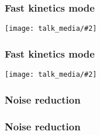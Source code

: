 \documentclass[aspectratio=1610]{beamer}
\newcommand{\pltsingle}[2][0.8]{
	\begin{center}
		\texttt{[image: talk\_media/\#2]}
	\end{center}
}
\begin{document}
\begin{frame}
	\frametitle{Fast kinetics mode}
	\pltsingle[0.7]{fast__kin_4.pdf}
\end{frame}

\begin{frame}
	\frametitle{Fast kinetics mode}
	\pltsingle[0.7]{fast__kin_5.pdf}
\end{frame}

\begin{frame}[c]
	\frametitle{Noise reduction}
	\centering
	\begin{center}
		\resizebox{!}{0.8\textheight}{}
	\end{center}
\end{frame}

\begin{frame}[c]
	\frametitle{Noise reduction}
	\centering
	\begin{center}
		\resizebox{!}{0.8\textheight}{}
	\end{center}
\end{frame}

\end{document}
